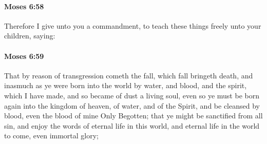 
		\paragraph{Moses 6:58} %
			\label{MOSES-6-58}

			Therefore I give unto you a commandment, to teach these things freely unto your children, saying:


		\paragraph{Moses 6:59} %
			\label{MOSES-6-59}

			That by reason of transgression cometh the fall, which fall bringeth death, and inasmuch as ye were born into the world by water, and blood, and the spirit, which I have made, and so became of dust a living soul, even so ye must be born again into the kingdom of heaven, of water, and of the Spirit, and be cleansed by blood, even the blood of mine Only Begotten; that ye might be sanctified from all sin, and enjoy the words of eternal life in this world, and eternal life in the world to come, even immortal glory;

			
